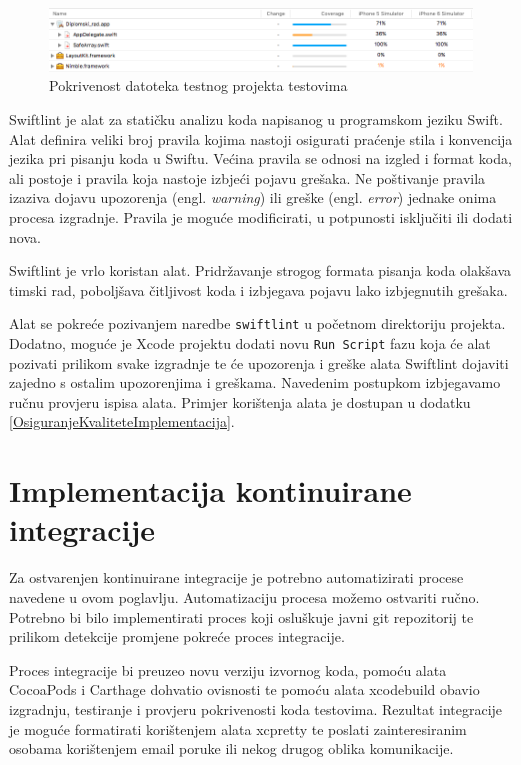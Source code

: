 \documentclass[times, utf8, diplomski, numeric]{fer}
\newcommand{\eng}[1]{(engl. \textit{#1})}
\begin{document}
\begin{figure}
\centering
\includegraphics[scale=0.4]{XcodeServerTestCoverage}
\caption{Pokrivenost datoteka testnog projekta testovima}
\label{fig:XcodeServerTestCoverage}
\end{figure}

Swiftlint je alat za statičku analizu koda napisanog u programskom jeziku Swift. Alat definira veliki broj pravila kojima nastoji osigurati praćenje stila i konvencija jezika pri pisanju koda u Swiftu\citep{SwiftLint}. Većina pravila se odnosi na izgled i format koda, ali postoje i pravila koja nastoje izbjeći pojavu grešaka. Ne poštivanje pravila izaziva dojavu upozorenja \eng{warning} ili greške \eng{error} jednake onima procesa izgradnje. Pravila je moguće modificirati, u potpunosti isključiti ili dodati nova.

Swiftlint je vrlo koristan alat. Pridržavanje strogog formata pisanja koda olakšava timski rad, poboljšava čitljivost koda i izbjegava pojavu lako izbjegnutih grešaka.

Alat se pokreće pozivanjem naredbe \verb|swiftlint| u početnom direktoriju projekta. Dodatno, moguće je Xcode projektu dodati novu \verb|Run Script| fazu koja će alat pozivati prilikom svake izgradnje te će upozorenja i greške alata Swiftlint dojaviti zajedno s ostalim upozorenjima i greškama. Navedenim postupkom izbjegavamo ručnu provjeru ispisa alata. Primjer korištenja alata je dostupan u dodatku \ref{OsiguranjeKvaliteteImplementacija}.


\section{Implementacija kontinuirane integracije} \label{XcodeServerCI}

Za ostvarenjen kontinuirane integracije je potrebno automatizirati procese navedene u ovom poglavlju. Automatizaciju procesa možemo ostvariti ručno. Potrebno bi bilo implementirati proces koji osluškuje javni git repozitorij te prilikom detekcije promjene pokreće proces integracije.

Proces integracije bi preuzeo novu verziju izvornog koda, pomoću alata CocoaPods i Carthage dohvatio ovisnosti te pomoću alata xcodebuild obavio izgradnju, testiranje i provjeru pokrivenosti koda testovima. Rezultat integracije je moguće formatirati korištenjem alata xcpretty te poslati zainteresiranim osobama korištenjem email poruke ili nekog drugog oblika komunikacije.
\end{document}
